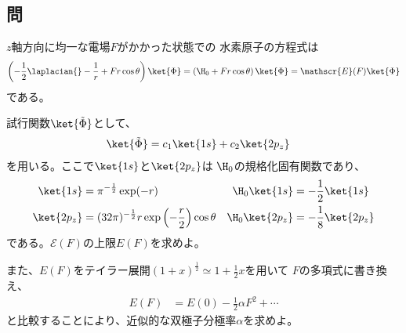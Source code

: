 \subsection{問}
$z$軸方向に均一な電場$F$がかかった状態での
水素原子の\Schrodinger 方程式は
\begin{align}
	\left(
		-
		\frac{1}{2}\laplacian{}
		-
		\frac{1}{r}
		+
		Fr\cos\theta
	\right)\ket{\Phi}
=
	\left(
		\H_0
		+
		Fr\cos\theta
	\right)\ket{\Phi}
=
	\mathscr{E}(F)\ket{\Phi}
\end{align}
である。

試行関数$\ket{\tilde{\Phi}}$として、
\begin{align}
	\ket{\tilde{\Phi}}
&=
	c_1 \ket{1s}
	+
	c_2 \ket{2p_z}
\end{align}
を用いる。ここで$\ket{1s}$と$\ket{2p_z}$は
$\H_0$の規格化固有関数であり、
\begin{align}
	\ket{1s}
&=
	\pi^{-\frac{1}{2}} \exp(-r) &
%
%
	\H_0 \ket{1s}
&=
	-
	\frac{1}{2} \ket{1s} \\
%
%
	\ket{2p_z}
&=
	(32\pi)^{-\frac{1}{2}} r \exp\left(-\frac{r}{2}\right) \cos\theta &
%
%
	\H_0 \ket{2p_z}
&=
	-\frac{1}{8} \ket{2p_z}
\end{align}
である。$\mathscr{E}(F)$の上限$E(F)$を求めよ。

また、$E(F)$をテイラー展開$(1+x)^{\frac{1}{2}}\simeq 1+\frac{1}{2}x$を用いて
$F$の多項式に書き換え、
\begin{align}
	E(F)
&=
	E(0)
	-
	\frac{1}{2} \alpha F^2
	+
	\cdots
\end{align}
と比較することにより、近似的な双極子分極率$\alpha$を求めよ。

